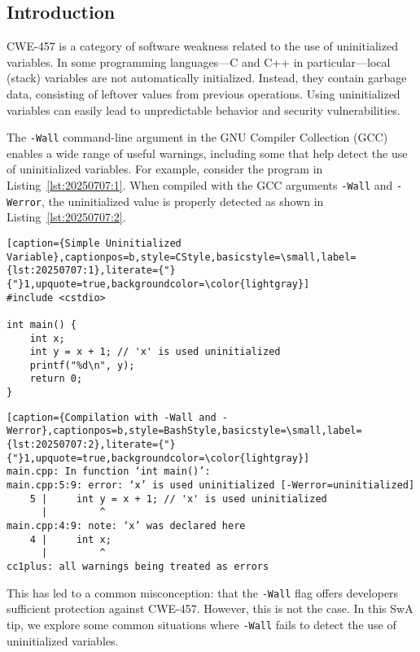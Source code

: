 \subsection{Introduction}

CWE-457 is a category of software weakness related to the use of uninitialized variables.\autocite{20250707:cwe-457} In some programming languages---C and C++ in particular---local (stack) variables are not automatically initialized. Instead, they contain garbage data, consisting of leftover values from previous operations. Using uninitialized variables can easily lead to unpredictable behavior and security vulnerabilities.

The \texttt{-Wall} command-line argument in the GNU Compiler Collection (GCC) enables a wide range of useful warnings, including some that help detect the use of uninitialized variables. For example, consider the program in Listing~\ref{lst:20250707:1}. When compiled with the GCC arguments \texttt{-Wall} and \texttt{-Werror}, the uninitialized value is properly detected as shown in Listing~\ref{lst:20250707:2}.


\begin{lstlisting}[caption={Simple Uninitialized Variable},captionpos=b,style=CStyle,basicstyle=\small,label={lst:20250707:1},literate={"}{"}1,upquote=true,backgroundcolor=\color{lightgray}]
#include <cstdio>

int main() {
	int x;
	int y = x + 1; // 'x' is used uninitialized
	printf("%d\n", y);
	return 0;
}
\end{lstlisting}

\begin{lstlisting}[caption={Compilation with -Wall and -Werror},captionpos=b,style=BashStyle,basicstyle=\small,label={lst:20250707:2},literate={"}{"}1,upquote=true,backgroundcolor=\color{lightgray}]
main.cpp: In function ‘int main()’:
main.cpp:5:9: error: ‘x’ is used uninitialized [-Werror=uninitialized]
    5 |     int y = x + 1; // 'x' is used uninitialized
      |         ^
main.cpp:4:9: note: ‘x’ was declared here
    4 |     int x;
      |         ^
cc1plus: all warnings being treated as errors
\end{lstlisting}

This has led to a common misconception: that the \texttt{-Wall} flag offers developers sufficient protection against CWE-457. However, this is not the case. In this SwA tip, we explore some common situations where \texttt{-Wall} fails to detect the use of uninitialized variables.

